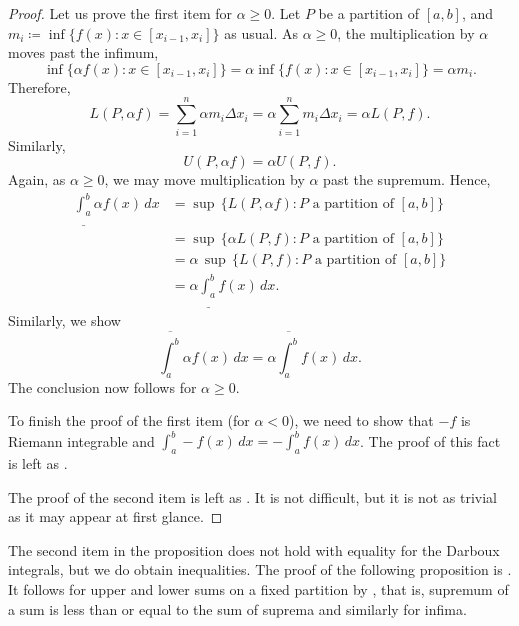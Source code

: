 \begin{proof}
\pagebreak[2]
Let us prove the first item for $\alpha \geq 0$. 
Let $P$ be a partition of $[a,b]$, and
$m_i \coloneqq \inf \bigl\{ f(x) : x \in [x_{i-1},x_i] \bigr\}$ as usual.
As $\alpha \geq 0$, the multiplication by $\alpha$ moves
past the infimum,
\begin{equation*}
\inf \bigl\{ \alpha f(x) : x \in [x_{i-1},x_i] \bigr\}
=
\alpha \inf \bigl\{ f(x) : x \in [x_{i-1},x_i] \bigr\} = \alpha m_i .
\end{equation*}
Therefore,
\begin{equation*}
L(P,\alpha f) =
\sum_{i=1}^n \alpha m_i \Delta x_i = \alpha \sum_{i=1}^n m_i \Delta x_i = \alpha
L(P,f).
\end{equation*}
Similarly,
\begin{equation*}
U(P,\alpha f) = \alpha U(P,f) .
\end{equation*}
Again, as $\alpha \geq 0$, we
may move multiplication by $\alpha$ past the supremum.  Hence,
\begin{equation*}
\begin{split}
\underline{\int_a^b} \alpha f(x)\,dx & =
\sup \, \bigl\{ L(P,\alpha f) : P \text{ a partition of } [a,b] \bigr\}
\\
& =
\sup \, \bigl\{ \alpha L(P,f) : P \text{ a partition of } [a,b] \bigr\}
\\
& =
\alpha \,
\sup \, \bigl\{ L(P,f) : P \text{ a partition of } [a,b] \bigr\}
\\
& =
\alpha
\underline{\int_a^b} f(x)\,dx .
\end{split}
\end{equation*}
Similarly, we show 
\begin{equation*}
\overline{\int_a^b} \alpha f(x)\,dx
=
\alpha
\overline{\int_a^b} f(x)\,dx .
\end{equation*}
The conclusion now follows for $\alpha \geq 0$.

To finish the proof of the first item (for $\alpha < 0$), we need to show 
that $-f$ is Riemann integrable and
$\int_a^b - f(x)\,dx =
-
\int_a^b f(x)\,dx$.  The proof of this fact is left as
.

The proof of the second item is left as
.
It is not difficult, but it is not as
trivial as it may appear at first glance.
\end{proof}

The second item in the proposition does not hold with
equality for the Darboux integrals, but we do obtain inequalities.
The proof of the following proposition is .
It follows for upper and lower sums on a fixed partition by ,
that is, supremum of a sum is less than or equal to the sum of
suprema and similarly for infima.

